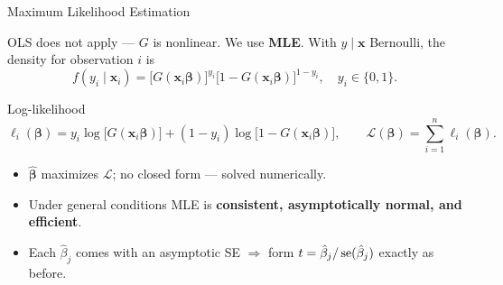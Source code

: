 \documentclass[aspectratio=169, 12pt]{beamer}
\newcommand{\xib}{\mathbf{x}_i\boldsymbol{\beta}}    %
\begin{document}
\begin{frame}[shrink=12]{Maximum Likelihood Estimation}

  OLS does not apply --- $G$ is nonlinear. We use \textbf{MLE}. With $y\mid\mathbf{x}$
  Bernoulli, the density for observation $i$ is
  \[
    f(y_i\mid\mathbf{x}_i) = \big[G(\xib)\big]^{y_i}\big[1-G(\xib)\big]^{1-y_i},
    \quad y_i \in \{0,1\}.
  \]

  \begin{definitionbox}{Log-likelihood}
    \[
      \ell_i(\boldsymbol{\beta}) = y_i \log\!\big[G(\xib)\big]
        + (1-y_i)\log\!\big[1 - G(\xib)\big],
      \qquad
      \mathcal{L}(\boldsymbol{\beta}) = \sum_{i=1}^{n} \ell_i(\boldsymbol{\beta}).
    \]
  \end{definitionbox}

  \smallskip

  \begin{keybox}
    \begin{itemize}
      \item $\hat{\boldsymbol\beta}$ maximizes $\mathcal{L}$; no closed form ---
        solved numerically.
      \item Under general conditions MLE is \textbf{consistent, asymptotically
        normal, and efficient}.
      \item Each $\hat\beta_j$ comes with an asymptotic SE $\Rightarrow$ form
        $t = \hat\beta_j / \operatorname{se}(\hat\beta_j)$ exactly as before.
    \end{itemize}
  \end{keybox}

\end{frame}
\end{document}
